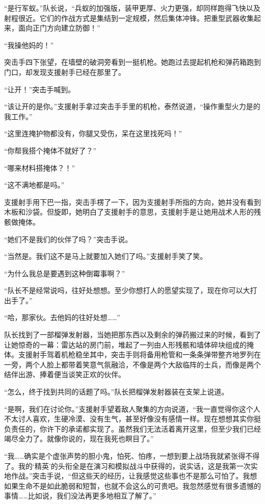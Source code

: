 “是行军蚁。”队长说，“兵蚁的加强版，装甲更厚、火力更强，却同样跑得飞快以及射程很近。它们的作战方式是集结到一定规模，然后集体冲锋。把重型武器收集起来，面向正门方向建立防御！”

“我操他妈的！”

突击手四下张望，在墙壁的破洞旁看到一挺机枪。她跑过去提起机枪和弹药箱跑到门口，却发现支援射手已经在那里了。

“让开！”突击手喊到。

“该让开的是你。”支援射手拿过突击手手里的机枪，泰然说道，“操作重型火力是的我工作。”

“这里连掩护物都没有，你腿又受伤，呆在这里找死吗！”

“你帮我搭个掩体不就好了？”

“哪来材料搭掩体？！”

“这不满地都是吗。”

支援射手用下巴一指，突击手楞了一下，因为支援射手所指的方向，她并没有看到木板和沙袋。但旋即，她明白了支援射手的意思，支援射手是让她用战术人形的残骸做掩体。

“她们不是我们的伙伴了吗？”突击手说。

“当然是。我们这不是马上就要加入她们了吗。”支援射手笑了笑。

“为什么我总是要遇到这种倒霉事啊？”

“队长不是经常说吗，往好处想想。至少你想打人的愿望实现了，现在你可以大打出手了。”

“哈，那家伙。去他妈的往好处想……”

队长找到了一部榴弹发射器，当她把那东西以及剩余的弹药搬过来的时候，看到了让她惊奇的一幕：雷达站的房门前，堆起了一列由人形残骸和墙体碎块组成的掩体。支援射手驾着机枪稳坐其中，突击手则将备用枪管和一条条弹带整齐地罗列在一旁，两个人脸上都带着笑意气氛融洽，不像是两个大敌临阵的士兵，而像是两个结伴出游、捧着便当谈笑正欢的伙伴。

“怎么，终于找到共同的话题了吗。”队长把榴弹发射器装在支架上说道。

“是啊，我们在讨论你。”支援射手望着敌人聚集的方向说道，“我一直觉得你这个人不太讨人喜欢，生硬冷漠、没有生气，甚至好像没有感情一样。现在想想其实你挺负责任的，你许下的承诺都实现了。虽然我们无法活着离开这里，但至少我们已经竭尽全力了。就像你说的，现在我死也瞑目了。”

“我……确实是个虚张声势的胆小鬼，怕死、怕疼，一想到要上战场我就紧张得不得了。我的‘精英’的头衔全是在演习和模拟战斗中获得的，说实话，这是我第一次实地作战。”突击手说，“但这些天的经历，让我感觉这些事也不是那么可怕了。我想如果生命不是如此脆弱和短暂，也就不会这么的可贵吧。我忽然感觉有很多遗憾的事情……比如说，我们没法再更多地相互了解了。”

